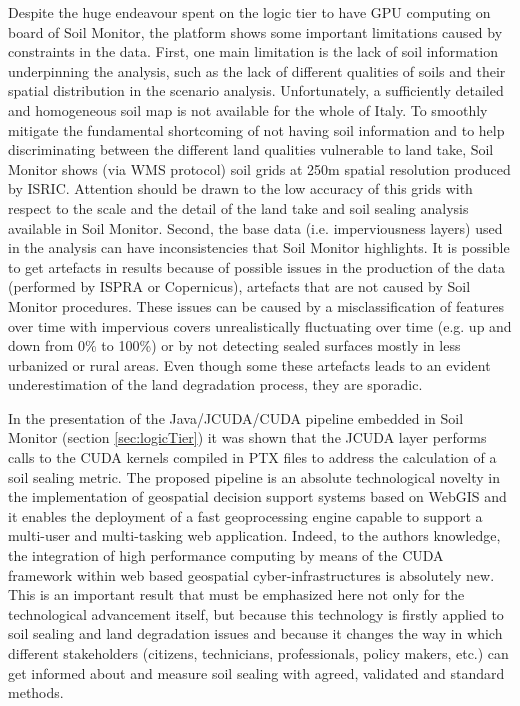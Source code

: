 \documentclass[APA,LATO1COL,doublespace]{WileyNJD-v2}
\begin{document}
Despite the huge endeavour spent on the logic tier to have GPU computing on board of Soil Monitor, the platform shows some important limitations caused by constraints in the data.
First, one main limitation is the lack of soil information underpinning the analysis, %
such as the lack of different qualities of soils and their spatial distribution in the scenario analysis.
Unfortunately, a sufficiently detailed and homogeneous soil map is not available for the whole of Italy.
To smoothly mitigate the fundamental shortcoming of not having soil information and to help discriminating between the different land qualities vulnerable to land take, Soil Monitor shows (via WMS protocol) soil grids at 250m spatial resolution produced by ISRIC.
Attention should be drawn to the low accuracy of this grids with respect to the scale and the detail of the land take and soil sealing analysis available in Soil Monitor.
Second, the base data (i.e. imperviousness layers) used in the analysis can have inconsistencies that Soil Monitor highlights.
It is possible to get artefacts in results %
because of possible issues in the production of the data (performed by ISPRA or Copernicus), artefacts that are not caused by Soil Monitor procedures. %
These issues can be caused by a misclassification of features over time with impervious covers unrealistically fluctuating over time (e.g. up and down from 0\% to 100\%) or by not detecting sealed surfaces mostly in less urbanized or rural areas.
Even though some these artefacts leads to an evident underestimation of the land degradation process, they are sporadic.

In the presentation of the Java/JCUDA/CUDA pipeline embedded in Soil Monitor (section \ref{sec:logicTier}) 
it was shown that the JCUDA layer performs calls to the CUDA kernels compiled in PTX files to address the calculation of a soil sealing metric.
The proposed pipeline is an absolute technological novelty in the implementation of geospatial decision support systems based on WebGIS and it enables the deployment of a fast geoprocessing engine capable to support a multi-user and multi-tasking web application.
Indeed, to the authors knowledge, the
integration of high performance computing by means of the CUDA framework within web based geospatial cyber-infrastructures is absolutely new.
This is an important result that must be emphasized here not only for the technological advancement itself, but because this technology is firstly applied to soil sealing and land degradation issues and because it changes the way in which different stakeholders (citizens, technicians, professionals, policy makers, etc.) can get informed about and measure soil sealing with agreed, validated and standard methods.
\end{document}
